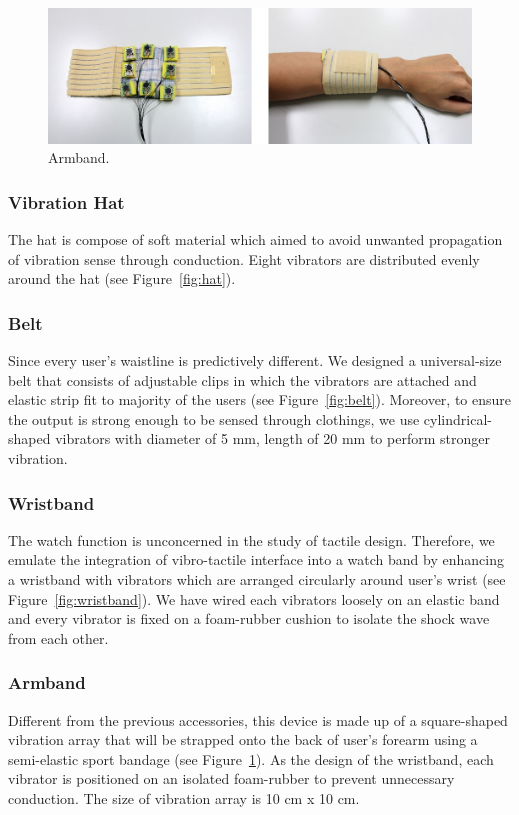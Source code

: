 \documentclass{sigchi}
\begin{document}
\begin{figure}[!b]
\centering
\includegraphics[width=0.9\columnwidth]{armband_4}
\caption{Armband.}
\label{fig:armband}
\end{figure}

\subsubsection{Vibration Hat}
The hat is compose of soft material which aimed to avoid unwanted propagation of vibration sense through conduction. Eight vibrators are distributed evenly around the hat (see Figure~\ref{fig:hat}).

\subsubsection{Belt}
Since every user's waistline is predictively different. We designed a universal-size belt that consists of adjustable clips in which the vibrators are attached and elastic strip fit to majority of the users (see Figure~\ref{fig:belt}). Moreover, to ensure the output is strong enough to be sensed through clothings, we use cylindrical-shaped vibrators with diameter of 5 mm, length of 20 mm to perform stronger vibration.

\subsubsection{Wristband}
The watch function is unconcerned in the study of tactile design. Therefore, we emulate the integration of vibro-tactile interface into a watch band by enhancing a wristband with vibrators which are arranged circularly around user's wrist (see Figure~\ref{fig:wristband}). We have wired each vibrators loosely on an elastic band and every vibrator is fixed on a foam-rubber cushion to isolate the shock wave from each other.

\subsubsection{Armband}
Different from the previous accessories, this device is made up of a square-shaped vibration array that will be strapped onto the back of user's forearm using a semi-elastic sport bandage (see Figure~\ref{fig:armband}). As the design of the wristband, each vibrator is positioned on an isolated foam-rubber to prevent unnecessary conduction. The size of vibration array is 10 cm x 10 cm.
\end{document}
